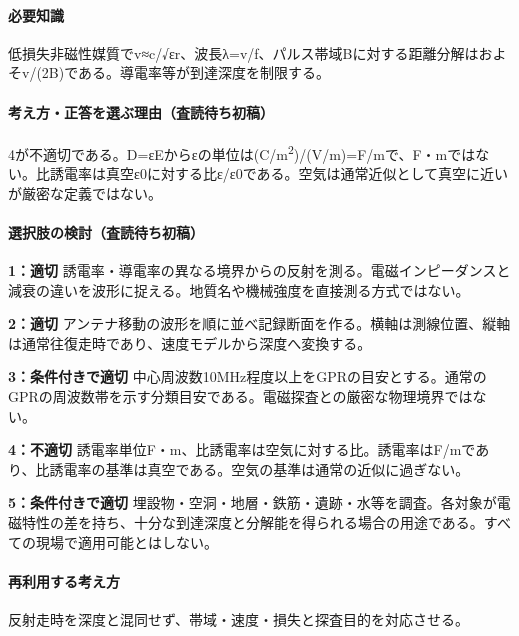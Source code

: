 \paragraph{必要知識} 低損失非磁性媒質でv≈c/√εr、波長λ=v/f、パルス帯域Bに対する距離分解はおよそv/(2B)である。導電率等が到達深度を制限する。

\paragraph{考え方・正答を選ぶ理由（査読待ち初稿）} 4が不適切である。D=εEからεの単位は(C/m\textsuperscript{2})/(V/m)=\allowbreak{}F/mで、F・mではない。比誘電率は真空ε0に対する比ε/ε0である。空気は通常近似として真空に近いが厳密な定義ではない。

\paragraph{選択肢の検討（査読待ち初稿）}\mbox{}\par

\noindent\textbf{1：適切} 誘電率・導電率の異なる境界からの反射を測る。電磁インピーダンスと減衰の違いを波形に捉える。地質名や機械強度を直接測る方式ではない。\par

\noindent\textbf{2：適切} アンテナ移動の波形を順に並べ記録断面を作る。横軸は測線位置、縦軸は通常往復走時であり、速度モデルから深度へ変換する。\par

\noindent\textbf{3：条件付きで適切} 中心周波数10MHz程度以上をGPRの目安とする。通常のGPRの周波数帯を示す分類目安である。電磁探査との厳密な物理境界ではない。\par

\noindent\textbf{4：不適切} 誘電率単位F・m、比誘電率は空気に対する比。誘電率はF/mであり、比誘電率の基準は真空である。空気の基準は通常の近似に過ぎない。\par

\noindent\textbf{5：条件付きで適切} 埋設物・空洞・地層・鉄筋・遺跡・水等を調査。各対象が電磁特性の差を持ち、十分な到達深度と分解能を得られる場合の用途である。すべての現場で適用可能とはしない。\par

\paragraph{再利用する考え方} 反射走時を深度と混同せず、帯域・速度・損失と探査目的を対応させる。

